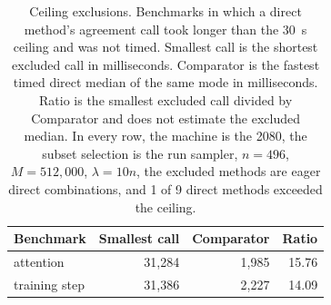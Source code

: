 \begin{table}[!htbp]
\caption{Ceiling exclusions. Benchmarks in which a direct method's agreement call took longer than the $30$~s ceiling and was not timed. Smallest call is the shortest excluded call in milliseconds. Comparator is the fastest timed direct median of the same mode in milliseconds. Ratio is the smallest excluded call divided by Comparator and does not estimate the excluded median. In every row, the machine is the 2080, the subset selection is the run sampler, $n = 496$, $M = 512{,}000$, $\lambda = 10n$, the excluded methods are eager direct combinations, and 1 of 9 direct methods exceeded the ceiling.}
\label{tab:ceiling}
\footnotesize
\setlength{\tabcolsep}{4pt}
\begin{tabular}{lrrr}
\toprule
Benchmark & Smallest call & Comparator & Ratio \\
\midrule
attention & 31,284 & 1,985 & 15.76 \\
training step & 31,386 & 2,227 & 14.09 \\
\bottomrule
\end{tabular}
\end{table}